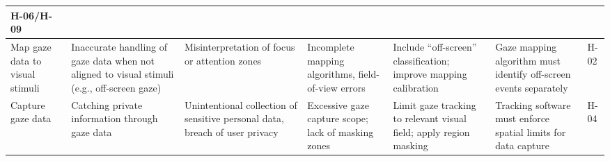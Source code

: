 \documentclass{article}
\begin{document}
\begin{table}[htbp]
{\begin{tabularx}{\textwidth}{|Y|Y|Y|Y|Y|Y|>{\centering\arraybackslash}p{1.2cm}|}
      H-06/H-09 \\
      \hline
      Map gaze data to visual stimuli & Inaccurate handling of gaze data when not aligned to visual stimuli (e.g., off-screen gaze) &
      Misinterpretation of focus or attention zones &
      Incomplete mapping algorithms, field-of-view errors &
      Include “off-screen” classification; improve mapping calibration &
      Gaze mapping algorithm must identify off-screen events separately &
      H-02 \\
      \hline
      Capture gaze data & Catching private information through gaze data &
      Unintentional collection of sensitive personal data, breach of user privacy &
      Excessive gaze capture scope; lack of masking zones &
      Limit gaze tracking to relevant visual field; apply region masking &
      Tracking software must enforce spatial limits for data capture &
      H-04 \\
      \hline
    \end{tabularx}%
  }
\end{table}

\restoregeometry
\end{document}
